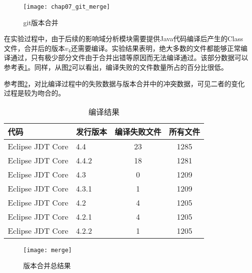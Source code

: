 \begin{figure}[H]
	\centering
	\texttt{[image: chap07\_git\_merge]}
	\caption {git版本合并}
	\label {exp_git_merge}	
\end{figure}



在实验过程中，由于后续的影响域分析模块需要提供Java代码编译后产生的Class文件，合并后的版本$v_4$还需要编译。实验结果表明，绝大多数的文件都能够正常编译通过，只有极少部分文件由于合并出错等原因而无法编译通过。该部分数据可以参考表\ref {data_git_merge2}。同样，从图\ref {data_merge_compile}可以看出，编译失败的文件数量所占的百分比很低。


参考图\ref {data_merge_compile}，对比编译过程中的失败数据与版本合并中的冲突数据，可见二者的变化过程是较为吻合的。

\begin{table}[H]
	\caption{编译结果}
	\label{data_git_merge2}
	\centering
	\begin{tabular}{llcc}
		\toprule[1.5pt]
		{\heiti 代码} & {\heiti 发行版本} & {\heiti 编译失败文件} & {\heiti 所有文件}\\\midrule[1pt]
		Eclipse JDT Core & 4.4 & 23 & 1285\\
		Eclipse JDT Core & 4.4.2 & 18 & 1281\\
		Eclipse JDT Core & 4.3 & 0 & 1209\\
		Eclipse JDT Core & 4.3.1 & 1 & 1209\\
		Eclipse JDT Core & 4.2 & 4 & 1205\\
		Eclipse JDT Core & 4.2.1 & 4 & 1205\\
		Eclipse JDT Core & 4.2.2 & 1 & 1205\\
		\bottomrule[1.5pt]
	\end{tabular}
\end{table}


\begin{figure}[H]
	\centering
	\texttt{[image: merge]}
	\caption {版本合并总结果}
	\label {data_merge_compile}	
\end{figure}



